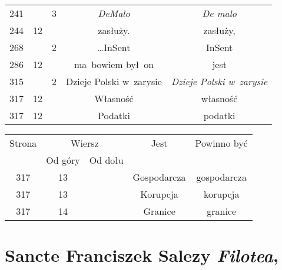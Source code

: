 \documentclass[a4paper,11pt]{article}
\numberwithin{equation}{section}
\begin{document}
\begin{center}
\begin{tabular}{|c|c|c|c|c|}
    241 & & \hphantom{0}3 & \textit{DeMalo} & \textit{De malo} \\
    244 & 12 & & zasłuży. & zasłuży, \\
    268 & & \hphantom{0}2 & \ldots InSent & InSent \\
    286 & 12 & & ma~bowiem był~on & jest \\
    315 & & \hphantom{0}2 & Dzieje Polski w~zarysie
    & \textit{Dzieje Polski w~zarysie} \\
    317 & 12 & & Własność & własność \\
    317 & 12 & & Podatki & podatki \\
    \hline
  \end{tabular}





  \newpage

  \begin{tabular}{|c|c|c|c|c|}
    \hline
    Strona & \multicolumn{2}{c|}{Wiersz} & Jest
                              & Powinno być \\ \cline{2-3}
    & Od góry & Od dołu & & \\
    \hline
    317 & 13 & & Gospodarcza & gospodarcza \\
    317 & 13 & & Korupcja & korupcja \\
    317 & 14 & & Granice & granice \\
    \hline
  \end{tabular}

\end{center}

\VerSpaceTwo













\section{Sancte Franciszek Salezy \textit{Filotea},
  \parencite{SancteFranciszekSalezyFilotea}}


\vspace{0em}
\end{document}
